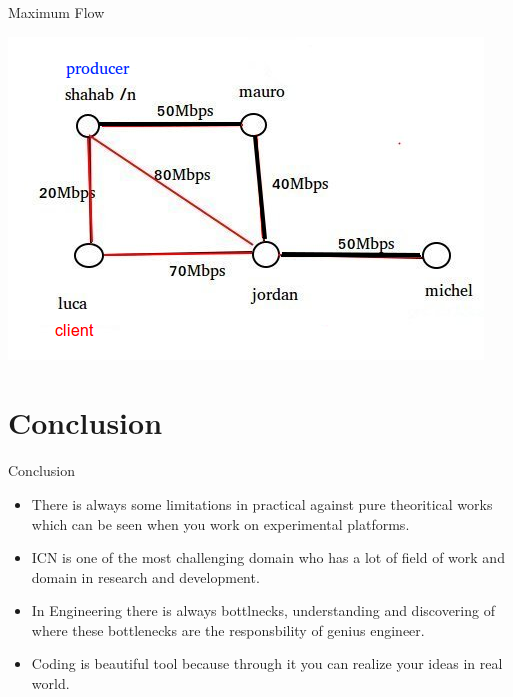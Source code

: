 \documentclass[8pt]{beamer}
\newcommand{\1}{\mathbbm 1}
\begin{document}
\begin{frame}{Maximum Flow}
{\begin{center}
\includegraphics[scale=0.32]{figures/MaxFlow2.png} 
\end{center}



}




\end{frame}

\section{Conclusion}

\begin{frame}{Conclusion}
\begin{itemize}
 
\item There is always some limitations in practical against pure theoritical works which can be seen when you work on experimental platforms.
\item ICN is one of the most challenging domain who has a lot of field of work and domain in research and development.
\item In Engineering there is always bottlnecks, understanding and discovering of where these bottlenecks are the responsbility of genius engineer.

\item Coding is beautiful tool because through it you can realize your ideas in real world.
\end{itemize}

\end{frame}

\end{document}
